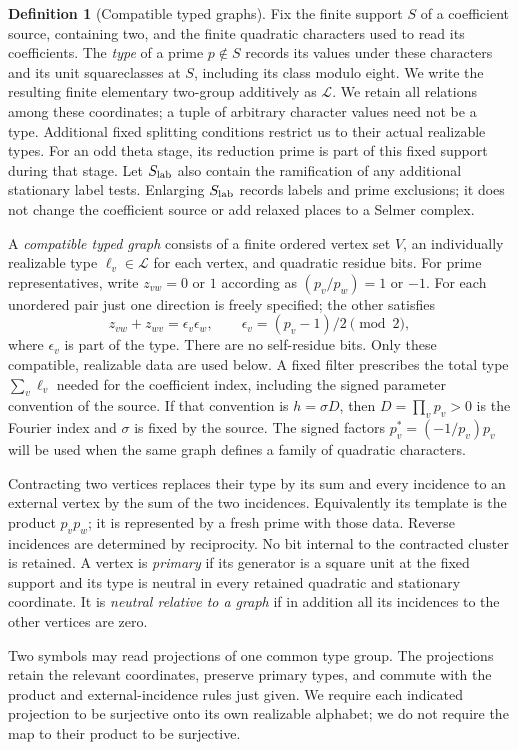 \documentclass[11pt]{article}
\theoremstyle{definition}
\newtheorem{definition}[theorem]{Definition}
\theoremstyle{remark}
\begin{document}
\begin{definition}[Compatible typed graphs]\label{ex:sec7-typed-graph}
Fix the finite support $S$ of a coefficient source, containing two,
and the finite quadratic characters used to read its coefficients.
The \emph{type} of a prime $p\notin S$ records its values under these
characters and its unit squareclasses at $S$, including its class
modulo eight. We write the resulting finite elementary two-group
additively as $\mathcal L$. We retain all relations among these
coordinates; a tuple of arbitrary character values need not be a type.
Additional fixed splitting conditions restrict us to their actual
realizable types. For an odd theta stage, its reduction prime is part
of this fixed support during that stage.
Let $S_{\rm lab}$ also contain the ramification of any additional
stationary label tests. Enlarging $S_{\rm lab}$ records labels and
prime exclusions; it does not change the coefficient source or add
relaxed places to a Selmer complex.

A \emph{compatible typed graph} consists of a finite ordered vertex
set $V$, an individually realizable type $\ell_v\in\mathcal L$ for
each vertex, and quadratic residue bits. For prime representatives,
write $z_{vw}=0$ or $1$ according as $(p_v/p_w)=1$ or $-1$.
For each unordered pair just one direction is freely specified; the
other satisfies
\[
 z_{vw}+z_{wv}=\epsilon_v\epsilon_w,\qquad
 \epsilon_v=(p_v-1)/2\pmod2,
\]
where $\epsilon_v$ is part of the type. There are no self-residue bits.
Only these compatible, realizable data are used below. A fixed filter
prescribes the total type $\sum_v\ell_v$ needed for the coefficient
index, including the signed parameter convention of the source.
If that convention is $h=\sigma D$, then $D=\prod_v p_v>0$ is the
Fourier index and $\sigma$ is fixed by the source. The signed factors
$p_v^*=(-1/p_v)p_v$ will be used when the same graph defines a family
of quadratic characters.

Contracting two vertices replaces their type by its sum and every
incidence to an external vertex by the sum of the two incidences.
Equivalently its template is the product $p_vp_w$; it is represented
by a fresh prime with those data. Reverse incidences are determined
by reciprocity. No bit internal to the contracted cluster is retained.
A vertex is \emph{primary} if its generator is a square unit at the
fixed support and its type is neutral in every retained quadratic
and stationary coordinate. It is \emph{neutral relative to a graph}
if in addition all its incidences to the other vertices are zero.

Two symbols may read projections of one common type group. The
projections retain the relevant coordinates, preserve primary types,
and commute with the product and external-incidence rules just given.
We require each indicated projection to be surjective onto its own
realizable alphabet; we do not require the map to their product to
be surjective.
\end{definition}
\end{document}
